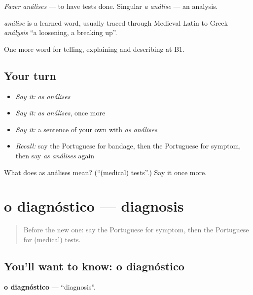 \emph{Fazer análises} — to have tests done. Singular \emph{a análise} — an analysis.

\begin{cousinweb}
\emph{análise} is a learned word, usually traced through Medieval Latin to Greek \emph{análysis} \textquotedblleft{}a loosening, a breaking up\textquotedblright{}.
\end{cousinweb}

\begin{grammarlens}[title={What you've built}]
One more word for telling, explaining and describing at B1.
\end{grammarlens}

\subsection*{Your turn}
\begin{itemize}
\raggedright
  \item \emph{Say it:} \emph{as análises}
  \item \emph{Say it:} \emph{as análises}, once more
  \item \emph{Say it:} a sentence of your own with \emph{as análises}
  \item \emph{Recall:} say the Portuguese for bandage, then the Portuguese for symptom, then say \emph{as análises} again
\end{itemize}

\begin{tcolorbox}[breakable,colback=teal!4,colframe=teal!35!black,title={Before you move on}]
What does as análises mean? (\textquotedblleft{}(medical) tests\textquotedblright{}.) Say it once more.
\end{tcolorbox}
\section[o diagnóstico]{o diagnóstico — diagnosis}

\label{lesson:PT-C487-diagnostico}



\begin{quote}
Before the new one: say the Portuguese for symptom, then the Portuguese for (medical) tests.
\end{quote}

\subsection*{You'll want to know: o diagnóstico}
\textbf{o diagnóstico} — \textquotedblleft{}diagnosis\textquotedblright{}.

